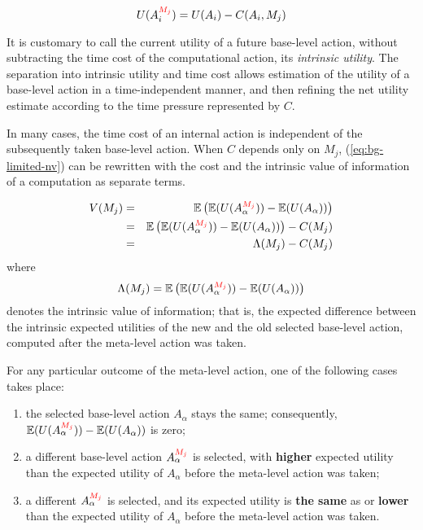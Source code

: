 \begin{equation}
\label{eq:bg-limited-iu}
U(A_i^{{\color{red} M_j}}) = U(A_i) - C(A_i, M_j)
\end{equation}

It is customary to call the current utility of a future base-level
action, without subtracting the time cost of the computational action,
its {\em intrinsic utility}. The separation
into intrinsic utility and time cost allows estimation of the utility
of a base-level action in a time-independent manner, and then refining
the net utility estimate according to the time pressure represented by $C$.

In many cases, the time cost of an internal action is independent of
the subsequently taken base-level action. When $C$ depends only on
$M_j$, (\ref{eq:bg-limited-nv}) can be rewritten with the cost and the
intrinsic value of information of a computation as separate terms.

\begin{eqnarray}
\label{eq:bg-limited-v=bc}
V(M_j)&=&\mathbb{E}\left(\mathbb{E}(U(A_\alpha^{{\color{red} M_j}}))-\mathbb{E}(U(A_\alpha))\right)\nonumber\\
     &=&\mathbb{E}\left(\mathbb{E}(U(A_\alpha^{{\color{red} M_j}}))-\mathbb{E}(U(A_\alpha))\right)-C(M_j)\\
     &=& \Lambda(M_j)-C(M_j)
\end{eqnarray}
where
\begin{equation}
\label{eq:bg-limited-benefit}
\Lambda(M_j)=\mathbb{E}\left(\mathbb{E}(U(A_\alpha^{{\color{red} M_j}}))-\mathbb{E}(U(A_\alpha))\right)
\end{equation}
denotes the intrinsic value of information; that is, the expected
difference between the intrinsic expected utilities of the new
and the old selected base-level action, computed after the meta-level
action was taken.

For any particular outcome of the meta-level action, one of the
following cases takes place:

\begin{enumerate}
\item the selected base-level action $A_\alpha$ stays the same;
  consequently, $\mathbb{E}(U(A_\alpha^{{\color{red} M_j}}))-\mathbb{E}(U(A_\alpha))$ is zero;
\item a different base-level action $A_\alpha^{{\color{red} M_j}}$ is selected, with
  {\bf higher} expected utility than the expected utility of
  $A_\alpha$ before the meta-level action was taken;
\item a different $A_\alpha^{{\color{red} M_j}}$ is selected, and its expected
  utility is {\bf the same} as or {\bf lower} than the expected
  utility of $A_\alpha$ before the meta-level action was taken.
\end{enumerate}

